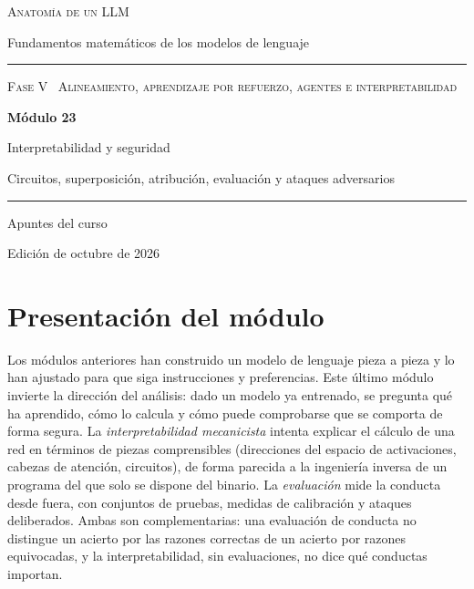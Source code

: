 \documentclass[11pt,a4paper,twoside,openany]{book}
\begin{document}
\frontmatter
\begin{titlepage}
\centering
\vspace*{2.5cm}
{\large\scshape Anatomía de un LLM}\par
\vspace{0.4cm}
{\normalsize Fundamentos matemáticos de los modelos de lenguaje}\par
\vspace{2.2cm}
\rule{\textwidth}{0.8pt}\par\vspace{0.5cm}
{\small\scshape Fase V \textperiodcentered\ Alineamiento, aprendizaje por refuerzo, agentes e interpretabilidad}\par\vspace{0.3cm}
{\Huge\bfseries Módulo 23\par}\vspace{0.3cm}
{\LARGE Interpretabilidad y seguridad\par}
\vspace{0.2cm}
{\large Circuitos, superposición, atribución, evaluación y ataques adversarios\par}
\vspace{0.5cm}\rule{\textwidth}{0.4pt}\par
\vspace{1.6cm}
{\large Apuntes del curso}\par
\vfill
{\small Edición de octubre de 2026}\par
\end{titlepage}

\chapter*{Presentación del módulo}

Los módulos anteriores han construido un modelo de lenguaje pieza a pieza y lo han ajustado para que siga instrucciones y preferencias. Este último módulo invierte la dirección del análisis: dado un modelo ya entrenado, se pregunta qué ha aprendido, cómo lo calcula y cómo puede comprobarse que se comporta de forma segura. La \emph{interpretabilidad mecanicista} intenta explicar el cálculo de una red en términos de piezas comprensibles (direcciones del espacio de activaciones, cabezas de atención, circuitos), de forma parecida a la ingeniería inversa de un programa del que solo se dispone del binario. La \emph{evaluación} mide la conducta desde fuera, con conjuntos de pruebas, medidas de calibración y ataques deliberados. Ambas son complementarias: una evaluación de conducta no distingue un acierto por las razones correctas de un acierto por razones equivocadas, y la interpretabilidad, sin evaluaciones, no dice qué conductas importan.
\end{document}
